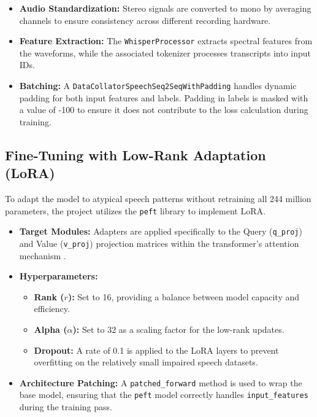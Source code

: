\documentclass[11pt]{article}
\begin{document}
\begin{itemize}
    \item \textbf{Audio Standardization:} Stereo signals are converted to mono by averaging channels to ensure consistency across different recording hardware.
    \item \textbf{Feature Extraction:} The \texttt{WhisperProcessor} extracts spectral features from the waveforms, while the associated tokenizer processes transcripts into input IDs.
    \item \textbf{Batching:} A \texttt{DataCollatorSpeechSeq2SeqWithPadding} handles dynamic padding for both input features and labels. Padding in labels is masked with a value of -100 to ensure it does not contribute to the loss calculation during training.
\end{itemize}

\subsection{Fine-Tuning with Low-Rank Adaptation (LoRA)}
To adapt the model to atypical speech patterns without retraining all 244 million parameters, the project utilizes the \texttt{peft} library to implement LoRA.

\begin{itemize}
    \item \textbf{Target Modules:} Adapters are applied specifically to the Query (\texttt{q\_proj}) and Value (\texttt{v\_proj}) projection matrices within the transformer's attention mechanism \citep{pokel2025variational}.
    \item \textbf{Hyperparameters:}
    \begin{itemize}
        \item \textbf{Rank ($r$):} Set to 16, providing a balance between model capacity and efficiency.
        \item \textbf{Alpha ($\alpha$):} Set to 32 as a scaling factor for the low-rank updates.
        \item \textbf{Dropout:} A rate of 0.1 is applied to the LoRA layers to prevent overfitting on the relatively small impaired speech datasets.
    \end{itemize}
    \item \textbf{Architecture Patching:} A \texttt{patched\_forward} method is used to wrap the base model, ensuring that the \texttt{peft} model correctly handles \texttt{input\_features} during the training pass.
\end{itemize}
\end{document}
